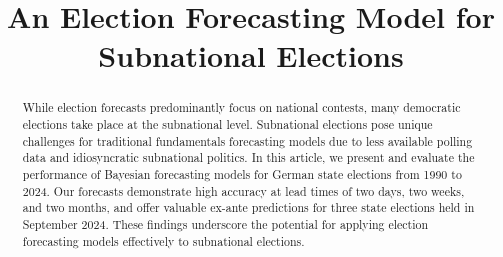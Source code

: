 \documentclass[doublespaced,12pt]{article}
\begin{document}
\title{An Election Forecasting Model for Subnational Elections} %


\author{} %
\maketitle


\begin{abstract}
While election forecasts predominantly focus on national contests, many democratic elections take place at the subnational level.  Subnational elections pose unique challenges for traditional fundamentals forecasting models due to less available polling data and idiosyncratic subnational politics. In this article, we present and evaluate the performance of Bayesian forecasting models for German state elections from 1990 to 2024. Our forecasts demonstrate high accuracy at lead times of two days, two weeks, and two months, and offer valuable ex-ante predictions for three state elections held in September 2024. These findings underscore the potential for applying election forecasting models effectively to subnational elections.
\end{abstract}



\end{document}
